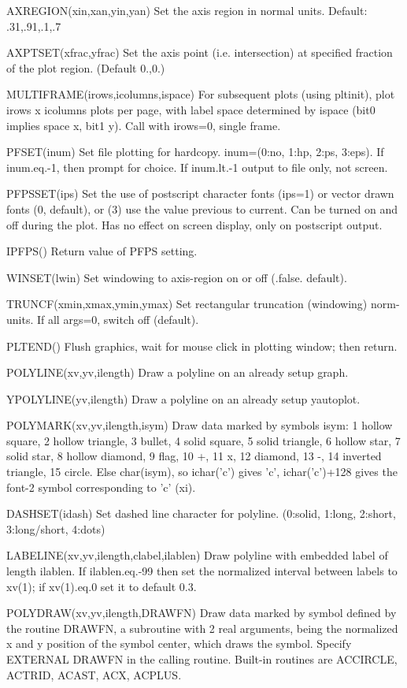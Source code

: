 AXREGION(xin,xan,yin,yan) Set the axis region in normal units.
Default: .31,.91,.1,.7

AXPTSET(xfrac,yfrac) Set the axis point (i.e. intersection) at specified
fraction of the plot region. (Default 0.,0.)

MULTIFRAME(irows,icolumns,ispace) For subsequent plots (using pltinit),
plot irows x icolumns plots per page, with label space determined by
ispace (bit0 implies space x, bit1 y). Call with irows=0, single frame.

PFSET(inum) Set file plotting for hardcopy. inum=(0:no, 1:hp, 2:ps, 3:eps).
If inum.eq.-1, then prompt for choice. If inum.lt.-1 output to file
only, not screen.

PFPSSET(ips) Set the use of postscript character fonts (ips=1) or vector
drawn fonts (0, default), or (3) use the value previous to current.
Can be turned on and off during the plot. Has no effect on screen
display, only on postscript output.

IPFPS() Return value of PFPS setting.

WINSET(lwin) Set windowing to axis-region on or off (.false. default).

TRUNCF(xmin,xmax,ymin,ymax) Set rectangular truncation (windowing) norm-units.
If all args=0, switch off (default).

PLTEND() Flush graphics, wait for mouse click in plotting window; then
return.



POLYLINE(xv,yv,ilength) Draw a polyline on an already setup graph.

YPOLYLINE(yv,ilength) Draw a polyline on an already setup yautoplot.

POLYMARK(xv,yv,ilength,isym) Draw data marked by symbols isym:
1 hollow square, 2 hollow triangle, 3 bullet, 4 solid square, 5 solid 
triangle, 6 hollow star, 7 solid star, 8 hollow diamond, 9 flag, 10 +,
11 x, 12 diamond, 13 -, 14 inverted triangle, 15 circle. Else
char(isym), so ichar('c') gives 'c', ichar('c')+128 gives the font-2
symbol corresponding to 'c' (xi).

DASHSET(idash) Set dashed line character for polyline. 
(0:solid, 1:long, 2:short, 3:long/short, 4:dots)

LABELINE(xv,yv,ilength,clabel,ilablen) Draw polyline with embedded label
of length ilablen. If ilablen.eq.-99 then set the normalized interval
between labels to xv(1); if xv(1).eq.0 set it to default 0.3.

POLYDRAW(xv,yv,ilength,DRAWFN) Draw data marked by symbol defined by
the routine DRAWFN, a subroutine with 2 real arguments, being the
normalized x and y position of the symbol center, which draws the symbol.
Specify EXTERNAL DRAWFN in the calling routine. Built-in routines are
ACCIRCLE, ACTRID, ACAST, ACX, ACPLUS.

